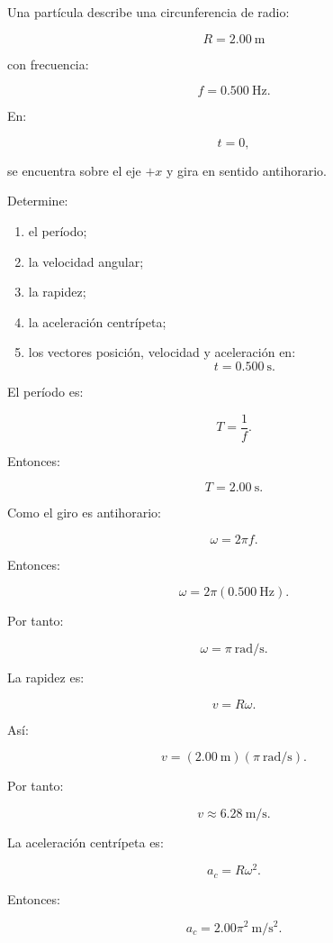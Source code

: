 \begin{ejemplo}

Una partícula describe una circunferencia de radio:

\[
R=\SI{2.00}{\meter}
\]

con frecuencia:

\[
f=\SI{0.500}{\hertz}.
\]

En:

\[
t=0,
\]

se encuentra sobre el eje \(+x\) y gira en sentido antihorario.

Determine:

\begin{enumerate}[label=\alph*)]
    \item el período;
    \item la velocidad angular;
    \item la rapidez;
    \item la aceleración centrípeta;
    \item los vectores posición, velocidad y aceleración en:
    \[
    t=\SI{0.500}{\second}.
    \]
\end{enumerate}

\end{ejemplo}

El período es:

\[
T=\frac{1}{f}.
\]

Entonces:

\[
\boxed{
T=\SI{2.00}{\second}
}.
\]

Como el giro es antihorario:

\[
\omega=2\pi f.
\]

Entonces:

\[
\omega
=
2\pi(\SI{0.500}{\hertz}).
\]

Por tanto:

\[
\boxed{
\omega=\pi\ \si{\radian\per\second}
}.
\]

La rapidez es:

\[
v=R\omega.
\]

Así:

\[
v
=
(\SI{2.00}{\meter})
(\pi\ \si{\radian\per\second}).
\]

Por tanto:

\[
\boxed{
v\approx
\SI{6.28}{\meter\per\second}
}.
\]

La aceleración centrípeta es:

\[
a_c=R\omega^2.
\]

Entonces:

\[
a_c
=
2.00\pi^2
\ \si{\meter\per\second\squared}.
\]

